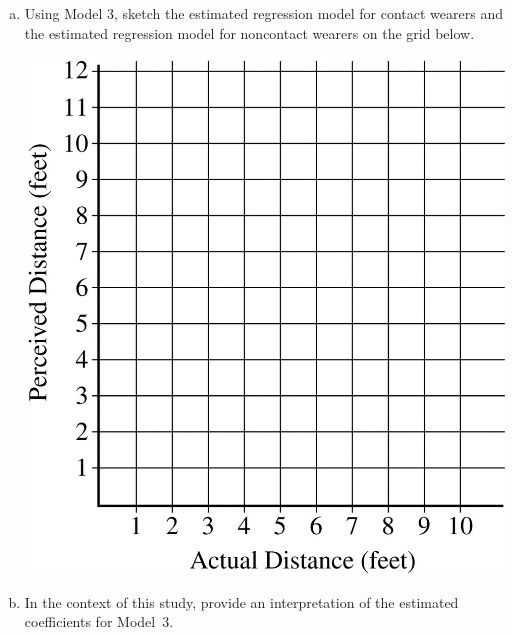 \documentclass[a4paper,12pt,twoside]{book}
\begin{document}
\begin{enumerate}
   \begin{enumerate}[(a), resume]
   \item Using Model 3, sketch the estimated regression model for contact wearers and the estimated regression model for noncontact wearers on the grid below.\\
   \begin{center}
   {\includegraphics[scale=0.15]{2007FR6-1.JPG}}
   \end{center}
    \item   In the context of this study, provide an interpretation of the estimated coefficients for \mbox{Model 3}.
   \end{enumerate}
   \newpage
   

\end{enumerate}
\end{document}
